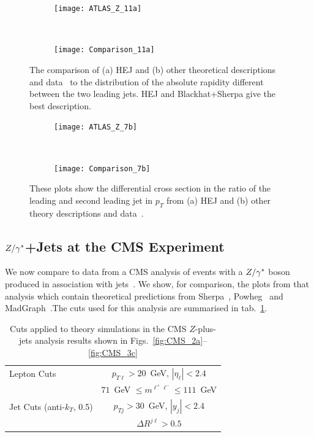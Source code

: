 			\begin{figure}[h]
			  \centering
			  \begin{subfigure}[b]{0.48\textwidth}
			    \texttt{[image: ATLAS\_Z\_11a]}
			    \caption{}
			    \label{fig:HEJ_ATLAS_11a}
			  \end{subfigure}
			  ~
			  \begin{subfigure}[b]{0.48\textwidth}
			    \texttt{[image: Comparison\_11a]}
			    \caption{}
			    \label{fig:MC_ATLAS_11a}
			  \end{subfigure}
			  \caption{The comparison of (a) HEJ and (b) other theoretical descriptions and
			    data~\cite{Aad:2013ysa} to
			    the distribution of the absolute rapidity different between the two leading
			    jets.  HEJ and Blackhat+Sherpa give the best description.}
			  \label{fig:ATLAS_11a}

			  \begin{subfigure}[b]{0.48\textwidth}
			    \texttt{[image: ATLAS\_Z\_7b]}
			    \caption{}
			    \label{fig:HEJ_ATLAS_7b}
			  \end{subfigure}
			  ~
			  \begin{subfigure}[b]{0.48\textwidth}
			    \texttt{[image: Comparison\_7b]}
			    \caption{}
			    \label{fig:MC_ATLAS_7b}
			  \end{subfigure}
			  \caption{These plots show the differential cross section in the ratio of the leading
			     and second leading jet in $p_T$ from (a) HEJ and (b) other
			    theory descriptions and data~\cite{Aad:2013ysa}.}
			  \label{fig:ATLAS_7b}
			\end{figure}

		\subsection{$Z/\gamma^*$+Jets at the CMS Experiment}
			\label{sub:CMS}

			We now compare to data from a CMS analysis of events with a $Z/\gamma^*$ boson produced
			in association with jets~\cite{Khachatryan:2014zya}.  We show, for comparison,
			the plots from that analysis which contain theoretical predictions from
			Sherpa~\cite{Gleisberg:2008ta,Hoeche:2012yf}, Powheg~\cite{Alioli:2010qp} and
			MadGraph~\cite{Alwall:2014hca}.The cuts used for this analysis are summarised in
			tab.~\ref{tab:cmscuts}.

			\begin{table}[hbt]
			  \centering
			  \begin{tabular}{|l|c|}
			    \hline
			    Lepton Cuts & $p_{T\ell}>20$~GeV, \; $|\eta_\ell|<2.4$ \\
			    &\; $71$~GeV $\leq m^{\ell^+\ell^-} \leq
			      111$~GeV \\ \hline
			    Jet Cuts (anti-$k_T$, 0.5) & $p_{Tj}>30$~GeV, \; $|y_j|<2.4$ \\
			    & $\Delta R^{j\ell} >0.5$ \\
			\hline
			  \end{tabular}
			  \caption{Cuts applied to theory simulations in the CMS
			    $Z$-plus-jets analysis results shown in
			    Figs.~\ref{fig:CMS_2a}--\ref{fig:CMS_3c}}
			  \label{tab:cmscuts}
			\end{table}

